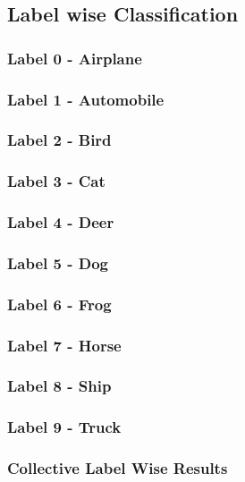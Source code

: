 \subsection{Label wise Classification}
\subsubsection{Label 0 - Airplane}
\subsubsection{Label 1 - Automobile}
\subsubsection{Label 2 - Bird}
\subsubsection{Label 3 - Cat}
\subsubsection{Label 4 - Deer}
\subsubsection{Label 5 - Dog}
\subsubsection{Label 6 - Frog}
\subsubsection{Label 7 - Horse}
\subsubsection{Label 8 - Ship}
\subsubsection{Label 9 - Truck}
\subsubsection{Collective Label Wise Results}